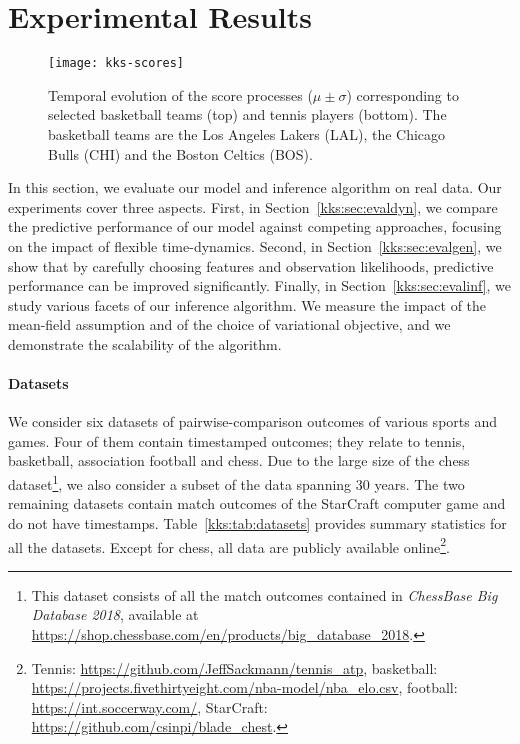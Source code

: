 \section{Experimental Results}
\label{kks:sec:eval}

\begin{figure}
	\centering
	\texttt{[image: kks-scores]}
	\caption{
		Temporal evolution of the score processes ($\mu \pm \sigma$) corresponding to selected basketball teams (top) and tennis players (bottom).
		The basketball teams are the Los Angeles Lakers (LAL), the Chicago Bulls (CHI) and the Boston Celtics (BOS).}
	\label{kks:fig:scores}
\end{figure}

In this section, we evaluate our model and inference algorithm on real data.
Our experiments cover three aspects.
First, in Section~\ref{kks:sec:evaldyn}, we compare the predictive performance of our model against competing approaches, focusing on the impact of flexible time-dynamics.
Second, in Section~\ref{kks:sec:evalgen}, we show that by carefully choosing features and observation likelihoods, predictive performance can be improved significantly.
Finally, in Section~\ref{kks:sec:evalinf}, we study various facets of our inference algorithm.
We measure the impact of the mean-field assumption and of the choice of variational objective, and we demonstrate the scalability of the algorithm.

\paragraph{Datasets}
We consider six datasets of pairwise-comparison outcomes of various sports and games.
Four of them contain timestamped outcomes; they relate to tennis, basketball, association football and chess.
Due to the large size of the chess dataset\footnote{%
	This dataset consists of all the match outcomes contained in \emph{ChessBase Big Database 2018}, available at \url{https://shop.chessbase.com/en/products/big_database_2018}.}, we also consider a subset of the data spanning 30 years.
The two remaining datasets contain match outcomes of the StarCraft computer game and do not have timestamps.
Table~\ref{kks:tab:datasets} provides summary statistics for all the datasets.
Except for chess, all data are publicly available online\footnote{%
	Tennis: \url{https://github.com/JeffSackmann/tennis_atp},
	basketball: \url{https://projects.fivethirtyeight.com/nba-model/nba_elo.csv},
	football: \url{https://int.soccerway.com/},
	StarCraft: \url{https://github.com/csinpi/blade_chest}.
}.

